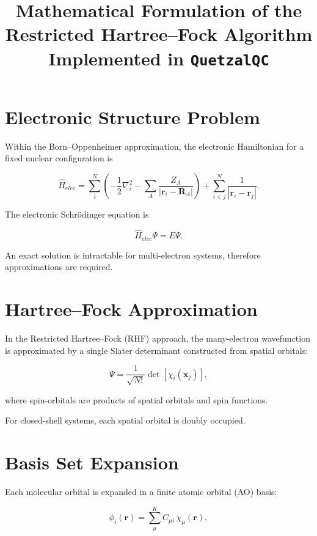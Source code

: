 \documentclass[11pt]{article}
\title{Mathematical Formulation of the Restricted Hartree--Fock Algorithm Implemented in \texttt{QuetzalQC}}
\author{}
\date{}
\begin{document}
\maketitle

\section{Electronic Structure Problem}

Within the Born--Oppenheimer approximation, the electronic Hamiltonian for a fixed nuclear configuration is

\begin{equation}
\hat{H}_{elec} =
\sum_{i}^{N} \left(
-\frac{1}{2} \nabla_i^2
- \sum_{A} \frac{Z_A}{|\mathbf{r}_i - \mathbf{R}_A|}
\right)
+
\sum_{i<j}^{N} \frac{1}{|\mathbf{r}_i - \mathbf{r}_j|}.
\end{equation}

The electronic Schrödinger equation is

\begin{equation}
\hat{H}_{elec} \Psi = E \Psi.
\end{equation}

An exact solution is intractable for multi-electron systems, therefore approximations are required.

\section{Hartree--Fock Approximation}

In the Restricted Hartree--Fock (RHF) approach, the many-electron wavefunction is approximated by a single Slater determinant constructed from spatial orbitals:

\begin{equation}
\Psi = \frac{1}{\sqrt{N!}} \det \left[ \chi_i(\mathbf{x}_j) \right],
\end{equation}

where spin-orbitals are products of spatial orbitals and spin functions.

For closed-shell systems, each spatial orbital is doubly occupied.

\section{Basis Set Expansion}

Each molecular orbital is expanded in a finite atomic orbital (AO) basis:

\begin{equation}
\phi_i(\mathbf{r}) = \sum_{\mu}^{K} C_{\mu i} \, \chi_\mu(\mathbf{r}),
\end{equation}
\end{document}
